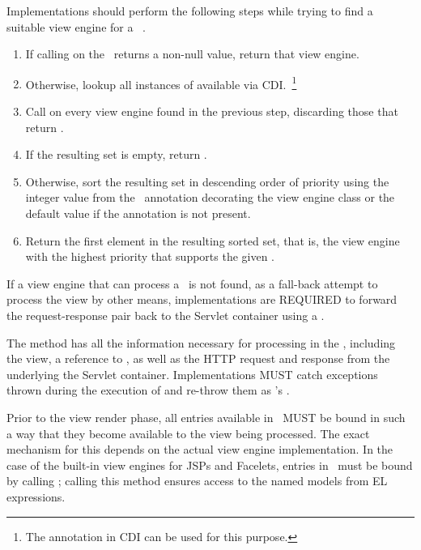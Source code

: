 Implementations should perform the following steps while trying to find
a suitable view engine for a \Viewable\ .

\begin{enumerate}
\item If calling  on the \Viewable\ returns a non-null value, return
that view engine.
\item Otherwise, lookup all instances of  available via 
CDI.~\footnote{The  annotation in CDI can be used for this purpose.}
\item Call  on every view engine found in the previous step, discarding
those that return .
\item If the resulting set is empty, return .
\item Otherwise, sort the resulting set in descending order of priority using the integer value 
from the \Priority\ annotation decorating the view engine class or the default value
  if the annotation is not present.
\item Return the first element in the resulting sorted set, that is, the view engine with
the highest priority that supports the given \Viewable.
\end{enumerate}

If a view engine that can process a \Viewable\ is not found, as a fall-back attempt to 
process the view by other means, implementations are 
REQUIRED to forward the request-response pair back to the Servlet container using a 
 .

The  method has all the information necessary for processing
in the ,
including the view, a reference to \Models, as well as the HTTP request and response
 from the underlying the Servlet container. Implementations MUST catch
exceptions thrown during the execution of  and re-throw them as 
's .

Prior to the view render phase, all entries available in \Models\ MUST be bound in
such a way that they become available to the view being processed. The exact mechanism
for this depends on the actual view engine implementation. In the case of the built-in
view engines for JSPs and Facelets, entries in \Models\ must be bound by calling
; calling this method ensures
access to the named models from EL expressions.

